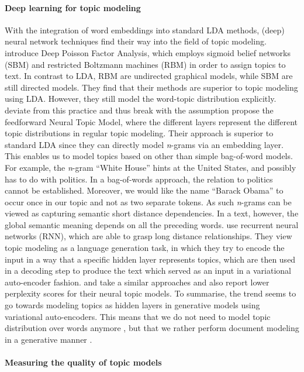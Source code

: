 \paragraph{Deep learning for topic modeling} With the integration of word embeddings into standard LDA methods, (deep) neural network techniques find their way into the field of topic modeling. \citet{ganscalable2015} introduce Deep Poisson Factor Analysis, which employs sigmoid belief networks (SBM) and restricted Boltzmann machines (RBM) in order to assign topics to text. In contrast to LDA, RBM are undirected graphical models, while SBM are still directed models. They find that their methods are superior to topic modeling using LDA. However, they still model the word-topic distribution explicitly. \citet{cao_novel_2015} deviate from this practice and thus break with the assumption propose the feedforward Neural Topic Model, where the different layers represent the different topic distributions in regular topic modeling. Their approach is superior to standard LDA since they can directly model \textit{n}-grams via an embedding layer. This enables us to model topics based on other than simple bag-of-word models. For example, the \textit{n}-gram ``White House'' hints at the United States, and possibly has to do with politics. In a bag-of-words approach, the relation to politics cannot be established. Moreover, we would like the name ``Barack Obama'' to occur once in our topic and not as two separate tokens. As such \textit{n}-grams can be viewed as capturing semantic short distance dependencies. In a text, however, the global semantic meaning depends on all the preceding words. \citet{DiengWGP16} use recurrent neural networks (RNN), which are able to grasp long distance relationships. They view topic modeling as a language generation task, in which they try to encode the input in a way that a specific hidden layer represents topics, which are then used in a decoding step to produce the text which served as an input in a variational auto-encoder fashion. \citet{miao_neural_2016}  and \citet{CardTS17} take a similar approaches and also report lower perplexity scores for their neural topic models. To summarise, the trend seems to go towards modeling topics as hidden layers in generative models using variational auto-encoders. This means that we do not need to model topic distribution over words anymore \citep{Srivastava2016NeuralVI}, but that we rather perform document modeling in a generative manner \citep{MiaoGB17}.

\paragraph{Measuring the quality of topic models} 

